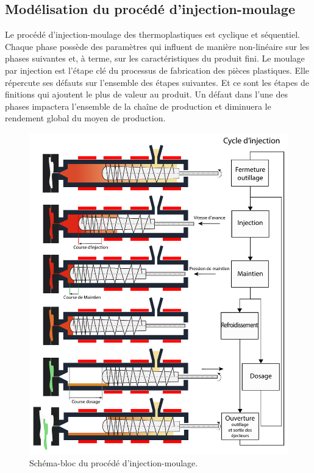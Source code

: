 \subsection{Modélisation du procédé d'injection-moulage}
Le procédé d'injection-moulage des thermoplastiques est cyclique et séquentiel.
Chaque phase possède des paramètres qui influent de manière non-linéaire sur les phases suivantes et, à terme, sur les caractéristiques du produit fini.
Le moulage par injection est l'étape clé du processus de fabrication des pièces plastiques.
Elle répercute ses défauts sur l'ensemble des étapes suivantes.
Et ce sont les étapes de finitions qui ajoutent le plus de valeur au produit.
Un défaut dans l’une des phases impactera l’ensemble de la chaîne de production et diminuera le rendement global du moyen de production.

\begin{figure}[hbtp]
	\centering
	\includegraphics[width=\textwidth,height=\textheight,keepaspectratio]{../Chap1/Figures/SAPRISTI_Schema-cycle.pdf}
	\caption{Schéma-bloc du procédé d'injection-moulage.}
	\label{fig:cycle_injection}
\end{figure}

